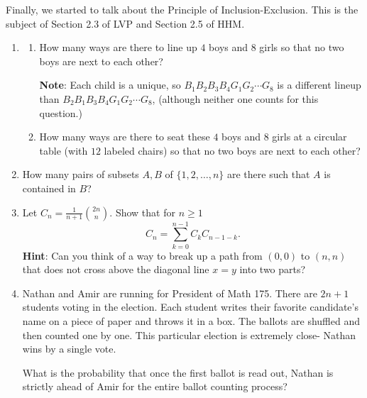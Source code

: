 \documentclass[11pt]{article}
\begin{document}
Finally, we started to talk about the Principle of Inclusion-Exclusion.  This is the subject of Section 2.3 of LVP and Section 2.5 of HHM.


\newpage


\begin{enumerate}

\item 
\begin{enumerate}
\item How many ways are there to line up $4$ boys and $8$ girls so that no two boys are next to each other?  

{\bf Note}: Each child is a unique, so $B_1 B_2 B_3 B_4 G_1 G_2 \cdots G_8$ is a different lineup than $B_2 B_1 B_3 B_4 G_1 G_2 \cdots G_8$, (although neither one counts for this question.)

\item How many ways are there to seat these $4$ boys and $8$ girls at a circular table (with $12$ labeled chairs) so that no two boys are next to each other?
\end{enumerate}

\item How many pairs of subsets $A, B$ of $\{1,2,\ldots, n\}$ are there such that $A$ is contained in $B$?

\item Let $C_n = \frac{1}{n+1} \binom{2n}{n}$.  Show that for $n\ge 1$
\[
C_n = \sum_{k=0}^{n-1} C_k C_{n-1-k}.
\]
{\bf Hint}: Can you think of a way to break up a path from $(0,0)$ to $(n,n)$ that does not cross above the diagonal line $x=y$ into two parts?

\vspace{1 cm}

\item Nathan and Amir are running for President of Math 175.  There are $2n+1$ students voting in the election.  Each student writes their favorite candidate's name on a piece of paper and throws it in a box.  The ballots are shuffled and then counted one by one.  This particular election is extremely close- Nathan wins by a single vote.

What is the probability that once the first ballot is read out, Nathan is strictly ahead of Amir for the entire ballot counting process?


\end{enumerate}
\end{document}
